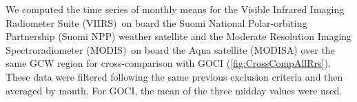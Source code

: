 \documentclass[onecolumn,3p,letterpaper,11pt]{elsarticle}
\begin{document}

We computed the time series of monthly means for the Visible Infrared Imaging Radiometer Suite (VIIRS)~on board the Suomi National Polar-orbiting Partnership (Suomi NPP) weather satellite and the Moderate Resolution Imaging Spectroradiometer (MODIS)~on board the Aqua satellite (MODISA) over the same GCW region for cross-comparison with GOCI (\autoref{fig:CrossCompAllRrs}). 
These data were filtered following the same previous exclusion criteria and then averaged by month. 
For GOCI, the mean of the three midday values were used.
\end{document}
